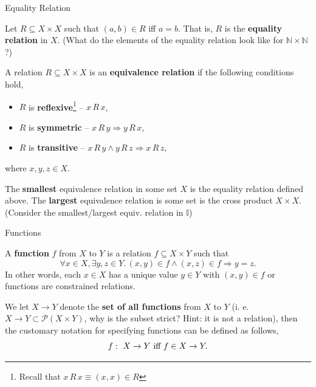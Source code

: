 \documentclass{beamer}
\begin{document}
\begin{frame}{Equality Relation}

Let $R \subseteq X\times X$ such that $(a,b)\in R$ iff $a=b$.  That is, $R$ is the {\bf equality relation}
in  $X$. (What do the elements of the equality relation look like for $\mathbb{N}\times\mathbb{N}$?)

\vspace{.1in}

A relation $R\subseteq X\times X$ is an {\bf equivalence relation} if the following conditions hold,
\begin{itemize}
\item $R$ is {\bf reflexive}\footnote{Recall that $x\, R\, x \equiv (x,x)\in R$} -- $x\, R\, x$,
\item $R$ is {\bf symmetric} -- $x\, R\, y \Rightarrow y\, R\, x$,
\item $R$ is {\bf transitive} -- $x\, R\, y \wedge y\, R\, z \Rightarrow x\, R\, z$,
\end{itemize}
where $x,y,z \in X$.

\vspace{.1in}

The {\bf smallest} equivalence relation in some set $X$ is the equality relation defined above.
The {\bf largest} equivalence relation is some set is the cross product $X\times X$. (Consider the
smallest/largest equiv. relation in $\mathbb I$)
\end{frame}

\begin{frame}{Functions}

A {\bf function} $f$ from $X$ to $Y$ is a relation $f \subseteq X\times Y$ such that
\[
\forall x\in X, \exists y,z\in Y.\, (x,y)\in f \wedge (x,z)\in f \Rightarrow y = z.
\]
In other words, each $x\in X$ has a unique value $y\in Y$ with $(x,y)\in f$ or functions are constrained relations.

\vspace{.1in}

We let $X \rightarrow Y$ denote the {\bf set of all functions} from $X$ to $Y$
(i. e. $X \rightarrow Y \subset {\mathcal P}(X\times Y)$, why is the subset strict? Hint: it is not a relation), then the customary notation
for specifying functions can be defined as follows,
\[
f\,\colon\; X \rightarrow Y \mbox{ iff } f\in X\rightarrow Y.
\]
\end{frame}
\end{document}
